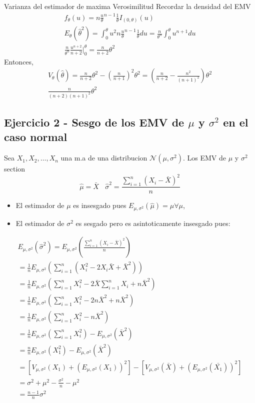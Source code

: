 \documentclass[a4paper]{article}
\begin{document}
Varianza del estimador de maxima Verosimilitud
Recordar la densidad del EMV
\begin{gather*}
    f_{\theta}(u) = n\frac{u}{\theta}^{n-1}\frac{1}{\theta}I_{(0,\theta)}(u)
    \\
    E_{\theta}(\widehat{\theta}^2) = \int_{0}^{\theta} u^2n \frac{u}{\theta}^{n-1} \frac{1}{\theta}du = \frac{n}{\theta^n}\int_{0}^{\theta}u^{n+1} du
    \\
    \frac{n}{\theta^n}\frac{u^{n+2}}{n+2}\Biggr|_{0}^{\theta} = \frac{n}{n+2}\theta^2
\end{gather*}
Entonces,
\begin{gather*}
    V_{\theta}(\widehat{\theta}) = \frac{n}{n+2}\theta^2 - (\frac{n}{n+1})^2\theta^2=(\frac{n}{n+2} - \frac{n^2}{(n+1)^2})\theta^2
    \\
    \frac{n}{(n+2)(n+1)^2}\theta^2
\end{gather*}

\subsection{Ejercicio 2 - Sesgo de los EMV de $\mu$ y $\sigma^2$ en el caso normal}
Sea $X_{1},X_{2},\dots,X_{n}$ una m.a de una distribucion $\mathcal{N}(\mu, \sigma^2)$. Los EMV de $\mu$ y $\sigma^2$ section
\begin{equation*}
    \widehat{\mu} = \bar{X} \ \ \ \ \widehat{\sigma}^2 = \frac{\sum_{i=1}^n (X_{i} - \bar{X})^2}{n}
\end{equation*}

\begin{itemize}
    \item El estimador de $\mu$ es insesgado pues $E_{\mu, \sigma^2}(\widehat{\mu}) = \mu \forall\mu$,
    \item El estimador de $\sigma^2$ es sesgado pero es asintoticamente insesgado pues:
\end{itemize}
\begin{gather*}
    E_{\mu, \sigma^2}(\widehat{\sigma}^2) = E_{\mu, \sigma^2}(\frac{\sum_{i=1}^n (X_{i} - \bar{X})^2}{n})
    \\
    = \frac{1}{n}E_{\mu, \sigma^2}(\sum_{i=1}^n (X_{i}^2 - 2X_{i}\bar{X} + \bar{X}^2))
    \\
    = \frac{1}{n}E_{\mu, \sigma^2}(\sum_{i=1}^n X_{i}^2 - 2\bar{X}\sum_{i=1}^n X_{i} + n\bar{X}^2)
    \\
    = \frac{1}{n}E_{\mu, \sigma^2}(\sum_{i=1}^n X_{i}^2 - 2n\bar{X}^2 + n\bar{X}^2)
    \\
    = \frac{1}{n}E_{\mu, \sigma^2}(\sum_{i=1}^n X_{i}^2 - n\bar{X}^2)
    \\
    = \frac{1}{n}E_{\mu, \sigma^2}(\sum_{i=1}^n X_{i}^2) - E_{\mu, \sigma^2}(\bar{X}^2)
    \\
    = \frac{n}{n}E_{\mu, \sigma^2}(X_{1}^2) - E_{\mu, \sigma^2}(\bar{X}^2)
    \\
    = [ V_{\mu, \sigma^2}(X_{1}) + (E_{\mu, \sigma^2}(X_{1}))^2] - [ V_{\mu, \sigma^2}(\bar{X}) + (E_{\mu, \sigma^2}(\bar{X_{1}}))^2]
    \\
    = \sigma^2 + \mu^2 - \frac{\sigma^2}{n} - \mu^2
    \\
    = \frac{n-1}{n}\sigma^2
\end{gather*}
\end{document}
